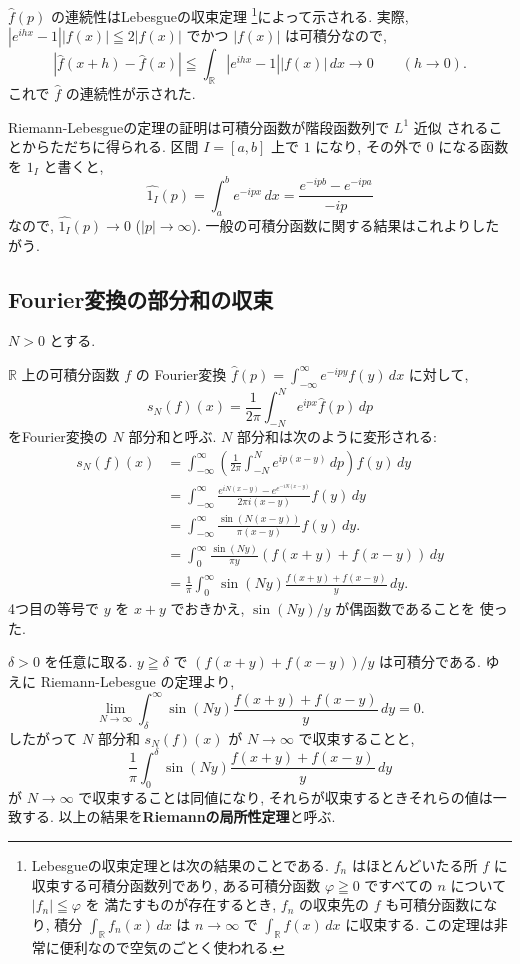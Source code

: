 \documentclass[12pt,twoside]{jarticle}
\newcommand\R{{\mathbb R}} %
\theoremstyle{jplain}
\theoremstyle{jplain}
\theoremstyle{jplain}
\numberwithin{theorem}{section}
\numberwithin{equation}{section}
\numberwithin{figure}{section}
\numberwithin{table}{section}
\begin{document}
$\hat{f}(p)$ の連続性はLebesgueの収束定理%
\footnote{Lebesgueの収束定理とは次の結果のことである.
$f_n$ はほとんどいたる所 $f$ に収束する可積分函数列であり, 
ある可積分函数 $\varphi\geqq 0$ ですべての $n$ について $|f_n|\leqq\varphi$ を
満たすものが存在するとき, 
$f_n$ の収束先の $f$ も可積分函数になり, 
積分 $\int_\R f_n(x)\,dx$ は $n\to\infty$ で
$\int_\R f(x)\,dx$ に収束する.
この定理は非常に便利なので空気のごとく使われる.}によって示される.
実際, $|e^{ihx}-1||f(x)|\leqq 2|f(x)|$ でかつ $|f(x)|$ は可積分なので, 
\[
|\widehat{f}(x+h)-\widehat{f}(x)|
\leqq\int_\R|e^{ihx}-1||f(x)|\,dx
\longrightarrow 0
\qquad(h\to 0).
\]
これで $\hat{f}$ の連続性が示された.

Riemann-Lebesgueの定理の証明は可積分函数が階段函数列で $L^1$ 近似
されることからただちに得られる. 区間 $I=[a,b]$ 上で $1$ になり, 
その外で $0$ になる函数を $1_I$ と書くと, 
\[
\widehat{1_I}(p) 
= \int_a^b e^{-ipx}\,dx
= \frac{e^{-ipb}-e^{-ipa}}{-ip}
\]
なので, $\widehat{1_I}(p)\to 0$ ($|p|\to\infty$). 
一般の可積分函数に関する結果はこれよりしたがう.


\subsection{Fourier変換の部分和の収束}
\label{sec:Ftransf-N}

$N>0$ とする.

$\R$ 上の可積分函数 $f$ の
Fourier変換 $\widehat{f}(p)=\int_{-\infty}^\infty e^{-ipy}f(y)\,dx$ に対して, 
\[
s_N(f)(x) = \frac{1}{2\pi}\int_{-N}^N e^{ipx} \widehat{f}(p)\,dp
\]
をFourier変換の $N$ 部分和と呼ぶ. $N$ 部分和は次のように変形される:
\begin{align*}
s_N(f)(x)
&=\int_{-\infty}^\infty
\left(\frac{1}{2\pi}\int_{-N}^N e^{ip(x-y)} \,dp\right) f(y)\,dy
\\ &
=\int_{-\infty}^\infty
\frac{e^{iN(x-y)}-e^{e^{-iN(x-y)}}}{2\pi i(x-y)} f(y)\,dy
\\ &
=\int_{-\infty}^\infty
\frac{\sin(N(x-y))}{\pi(x-y)} f(y)\,dy.
\\ &
=\int_0^\infty
\frac{\sin(Ny)}{\pi y} (f(x+y)+f(x-y))\,dy
\\ &
=\frac{1}{\pi}\int_0^\infty
\sin(Ny) \frac{f(x+y)+f(x-y)}{y} \,dy.
\end{align*}
4つ目の等号で $y$ を $x+y$ でおきかえ, $\sin(Ny)/y$ が偶函数であることを
使った. 

$\delta>0$ を任意に取る.
$y\geqq \delta$ で $(f(x+y)+f(x-y))/y$ は可積分である.
ゆえに Riemann-Lebesgue の定理より,
\[
\lim_{N\to\infty}
\int_\delta^\infty
\sin(Ny) \frac{f(x+y)+f(x-y)}{y} \,dy
= 0.
\]
したがって $N$ 部分和 $s_N(f)(x)$ が $N\to\infty$ で収束することと, 
\[
\frac{1}{\pi}\int_0^\delta
\sin(Ny) \frac{f(x+y)+f(x-y)}{y} \,dy
\]
が $N\to\infty$ で収束することは同値になり, 
それらが収束するときそれらの値は一致する.
以上の結果を{\bf Riemannの局所性定理}と呼ぶ.
\end{document}
